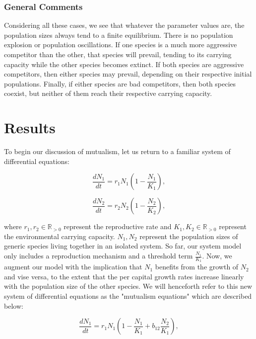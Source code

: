 \documentclass[11pt,a4paper]{scrartcl}
\theoremstyle{definition}
\begin{document}
\subsubsection{General Comments}

Considering all these cases, we see that whatever the parameter values are, the population sizes always tend to a finite equilibrium. There is no population explosion or population oscillations. If one species is a much more aggressive competitor than the other, that species will prevail, tending to its carrying capacity while the other species becomes extinct. If both species are aggressive competitors, then either species may prevail, depending on their respective initial populations. Finally, if either species are bad competitors, then both species coexist, but neither of them reach their respective carrying capacity.


\section{Results}

To begin our discussion of mutualism, let us return to a familiar system of differential equations: 

\begin{equation} \tag{11}
	\frac{dN_1}{dt}=r_1N_1(1-\frac{N_1}{K_1}),
\end{equation}

\begin{equation} \tag{12}
	\frac{dN_2}{dt}=r_2N_2(1-\frac{N_2}{K_2}),
\end{equation}

where $r_1, r_2 \in \mathbb{R}_{>0}$ represent the reproductive rate and $K_1, K_2 \in \mathbb{R}_{>0}$ represent the environmental carrying capacity. $N_1, N_2$ represent the population sizes of generic species living together in an isolated system. So far, our system model only includes a reproduction mechanism and a threshold term $\frac{N_1}{K_1}$. Now, we augment our model with the implication that $N_1$ benefits from the growth of $N_2$ and vise versa, to the extent that the per capital growth rates increase linearly with the population size of the other species. We will henceforth refer to this new system of differential equations as the "mutualism equations" which are described below:

\begin{equation} \label{eq18}
	\frac{dN_1}{dt}=r_1N_1(1-\frac{N_1}{K_1}+b_{12}\frac{N_2}{K_1}),
\end{equation}
\end{document}
